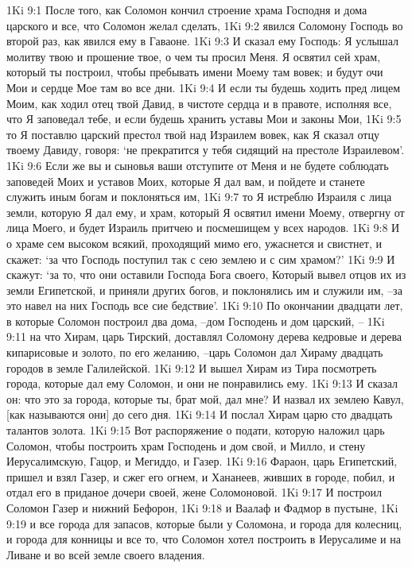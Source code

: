 1Ki 9:1  После того, как Соломон кончил строение храма Господня и дома царского и все, что Соломон желал сделать,
1Ki 9:2  явился Соломону Господь во второй раз, как явился ему в Гаваоне.
1Ki 9:3  И сказал ему Господь: Я услышал молитву твою и прошение твое, о чем ты просил Меня. Я освятил сей храм, который ты построил, чтобы пребывать имени Моему там вовек; и будут очи Мои и сердце Мое там во все дни.
1Ki 9:4  И если ты будешь ходить пред лицем Моим, как ходил отец твой Давид, в чистоте сердца и в правоте, исполняя все, что Я заповедал тебе, и если будешь хранить уставы Мои и законы Мои,
1Ki 9:5  то Я поставлю царский престол твой над Израилем вовек, как Я сказал отцу твоему Давиду, говоря: `не прекратится у тебя сидящий на престоле Израилевом'.
1Ki 9:6  Если же вы и сыновья ваши отступите от Меня и не будете соблюдать заповедей Моих и уставов Моих, которые Я дал вам, и пойдете и станете служить иным богам и поклоняться им,
1Ki 9:7  то Я истреблю Израиля с лица земли, которую Я дал ему, и храм, который Я освятил имени Моему, отвергну от лица Моего, и будет Израиль притчею и посмешищем у всех народов.
1Ki 9:8  И о храме сем высоком всякий, проходящий мимо его, ужаснется и свистнет, и скажет: `за что Господь поступил так с сею землею и с сим храмом?'
1Ki 9:9  И скажут: `за то, что они оставили Господа Бога своего, Который вывел отцов их из земли Египетской, и приняли других богов, и поклонялись им и служили им, --за это навел на них Господь все сие бедствие'.
1Ki 9:10  По окончании двадцати лет, в которые Соломон построил два дома, --дом Господень и дом царский, --
1Ki 9:11  на что Хирам, царь Тирский, доставлял Соломону дерева кедровые и дерева кипарисовые и золото, по его желанию, --царь Соломон дал Хираму двадцать городов в земле Галилейской.
1Ki 9:12  И вышел Хирам из Тира посмотреть города, которые дал ему Соломон, и они не понравились ему.
1Ki 9:13  И сказал он: что это за города, которые ты, брат мой, дал мне? И назвал их землею Кавул, [как называются они] до сего дня.
1Ki 9:14  И послал Хирам царю сто двадцать талантов золота.
1Ki 9:15  Вот распоряжение о подати, которую наложил царь Соломон, чтобы построить храм Господень и дом свой, и Милло, и стену Иерусалимскую, Гацор, и Мегиддо, и Газер.
1Ki 9:16  Фараон, царь Египетский, пришел и взял Газер, и сжег его огнем, и Хананеев, живших в городе, побил, и отдал его в приданое дочери своей, жене Соломоновой.
1Ki 9:17  И построил Соломон Газер и нижний Бефорон,
1Ki 9:18  и Ваалаф и Фадмор в пустыне,
1Ki 9:19  и все города для запасов, которые были у Соломона, и города для колесниц, и города для конницы и все то, что Соломон хотел построить в Иерусалиме и на Ливане и во всей земле своего владения.
